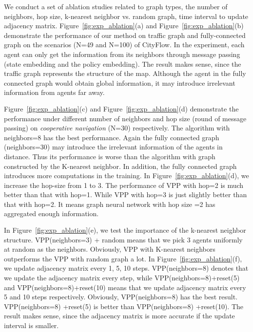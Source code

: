 \documentclass[11pt,a4paper]{article}
\theoremstyle{definition}
\begin{document}
We conduct a set of ablation studies related to graph types, the number of neighbors,  hop size, k-nearest neighbor vs. random graph, time interval to update adjacency matrix.
Figure~\ref{fig:exp_ablation}(a) and Figure~\ref{fig:exp_ablation}(b) demonstrate the performance of our method on traffic graph and fully-connected graph on the scenarios (N=49 and N=100) of CityFlow. In the experiment, each agent can only get the information from its neighbors through message passing (state embedding and the policy embedding). The result makes sense, since the traffic graph represents the structure of the map. Although the agent in the  fully connected graph would obtain global information, it may introduce irrelevant information from agents far away.

Figure~\ref{fig:exp_ablation}(c) and Figure~\ref{fig:exp_ablation}(d) demonstrate the  performance under different number of neighbors and hop size (round of message passing)  on \textit{cooperative navigation} (N=30) respectively. The algorithm with neighbors=8 has the best performance. Again the fully connected graph (neighbors=30) may introduce the irrelevant information of the agents in distance. Thus its performance is worse than the algorithm with graph constructed by the K-nearest neighbor. In addition, the fully connected graph  introduces more computations in the training. In Figure~\ref{fig:exp_ablation}(d), we increase the hop-size from 1 to 3. The performance of VPP with hop=2 is much better than that with hop=1. While VPP with hop=3 is just slightly better than that with hop=2. It means graph neural network with hop size =2 has aggregated enough information.

In Figure~\ref{fig:exp_ablation}(e), we test the importance of the k-nearest neighbor structure. VPP(neighbors=3)  + random means that we  pick $3$ agents uniformly at random as the neighbors. Obviously, VPP with K-nearest neighbors outperforms the  VPP with random graph a lot.  In Figure~\ref{fig:exp_ablation}(f), we update adjacency matrix every 1, 5, 10 steps. VPP(neighbors=8) denotes that we update the adjacency matrix every step, while VPP(neighbors=8)+reset(5) and VPP(neighbors=8)+reset(10) means that we update adjacency matrix every 5 and 10 steps respectively. Obviously, VPP(neighbors=8) has the best result. VPP(neighbors=8)  +reset(5) is better than VPP(neighbors=8)   +reset(10). The result makes sense, since the adjacency matrix is more accurate if the update interval is smaller.
\end{document}
